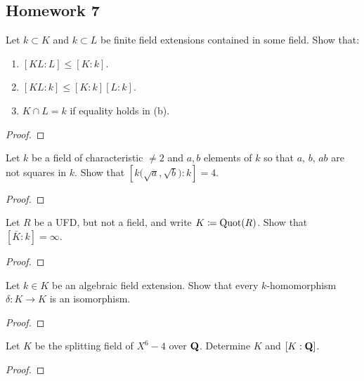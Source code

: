 \subsection{Homework 7}
\begin{problem}
  Let $k\subset K$ and $k\subset L$ be finite field extensions contained in
  some field. Show that:
  \begin{enumerate}[label=(\alph*),noitemsep]
  \item $[KL:L]\leq [K:k]$.
  \item $[KL:k]\leq [K:k][L:k]$.
  \item $K\cap L=k$ if equality holds in (b).
  \end{enumerate}
\end{problem}
\begin{proof}
\end{proof}

\begin{problem}
  Let $k$ be a field of characteristic $\neq 2$ and $a,b$ elements of $k$
  so that $a$, $b$, $ab$ are not squares in $k$. Show that
  $\left[k{\bigl(\sqrt{a},\sqrt{b}\bigr)}:k\right]=4$.
\end{problem}
\begin{proof}
\end{proof}

\begin{problem}
  Let $R$ be a UFD, but not a field, and write $K\coloneqq\operatorname{Quot}(R)$. Show
  that $[\bar K:k]=\infty$.
\end{problem}
\begin{proof}
\end{proof}

\begin{problem}
  Let $k\in K$ be an algebraic field extension. Show that every
  $k$-homomorphism $\delta\colon K\to K$ is an isomorphism.
\end{problem}
\begin{proof}
\end{proof}

\begin{problem}
  Let $K$ be the splitting field of $X^6-4$ over $\mathbf{Q}$. Determine $K$ and
  $[K:\mathbf{Q}]$.
\end{problem}
\begin{proof}
\end{proof}

